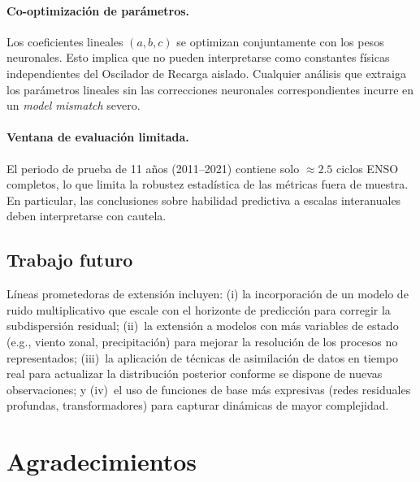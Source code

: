\documentclass[11pt,a4paper]{article}
\begin{document}
\paragraph{Co-optimización de parámetros.} Los coeficientes lineales $(a, b, c)$ se optimizan conjuntamente con los pesos neuronales. Esto implica que no pueden interpretarse como constantes físicas independientes del Oscilador de Recarga aislado. Cualquier análisis que extraiga los parámetros lineales sin las correcciones neuronales correspondientes incurre en un \textit{model mismatch} severo.

\paragraph{Ventana de evaluación limitada.} El periodo de prueba de 11 años (2011--2021) contiene solo $\approx 2.5$ ciclos ENSO completos, lo que limita la robustez estadística de las métricas fuera de muestra. En particular, las conclusiones sobre habilidad predictiva a escalas interanuales deben interpretarse con cautela.



\subsection{Trabajo futuro}

Líneas prometedoras de extensión incluyen: (i) la incorporación de un modelo de ruido multiplicativo que escale con el horizonte de predicción para corregir la subdispersión residual; (ii)~la extensión a modelos con más variables de estado (e.g., viento zonal, precipitación) para mejorar la resolución de los procesos no representados; (iii)~la aplicación de técnicas de asimilación de datos en tiempo real para actualizar la distribución posterior conforme se dispone de nuevas observaciones; y (iv)~el uso de funciones de base más expresivas (redes residuales profundas, transformadores) para capturar dinámicas de mayor complejidad.






\section*{Agradecimientos}
\end{document}
